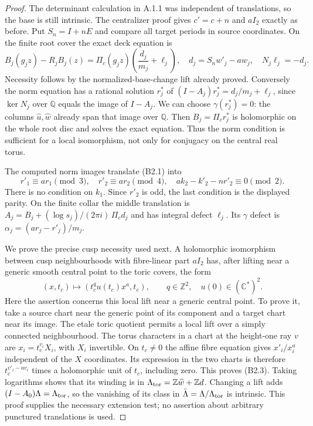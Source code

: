 \begin{proof}
The determinant calculation in A.1.1 was independent of translations, so the base is still intrinsic. The centralizer proof gives $c'=c+n$ and $aI_2$ exactly as before. Put $S_n=I+nE$ and compare all target periods in source coordinates. On the finite root cover the exact deck equation is
\[
 B_j(g_jz)-R_jB_j(z)=\Pi_c(g_jz)\left(\frac{d_j}{m_j}+\ell_j\right),
 \quad d_j=S_nw'_j-a w_j,
 \quad N_j\ell_j=-d_j.                                      \tag{B2.1}
\]
Necessity follows by the normalized-base-change lift already proved. Conversely the norm equation has a rational solution $r_j^*$ of
$(I-A_j)r_j^*=d_j/m_j+\ell_j$, since $\ker N_j$ over $\mathbb Q$ equals the image of $I-A_j$. We can choose $\gamma(r_j^*)=0$: the columns $\widehat u,\widehat w$ already span that image over $\mathbb Q$. Then $B_j=\Pi_cr_j^*$ is holomorphic on the whole root disc and solves the exact equation. Thus the norm condition is sufficient for a local isomorphism, not only for conjugacy on the central real torus.

The computed norm images translate (B2.1) into
\[
 r'_1\equiv ar_1\pmod3,\quad r'_2\equiv ar_2\pmod4,
 \quad ak_2-k'_2-nr'_2\equiv0\pmod2.                       \tag{B2.2}
\]
There is no condition on $k_1$. Since $r'_2$ is odd, the last condition is the displayed parity. On the finite collar the middle translation is
$A_j=B_j+(\log s_j)/(2\pi i)\,\Pi_cd_j$ and has integral defect $\ell_j$. Its $\gamma$ defect is
$\alpha_j=(ar_j-r'_j)/m_j$.

We prove the precise cusp necessity used next. A holomorphic isomorphism between cusp neighbourhoods with fibre-linear part $aI_2$ has, after lifting near a generic smooth central point to the toric covers, the form
\[
 (x,t_c)\longmapsto(t_c^q u(t_c)x^a,t_c),\qquad q\in\mathbb Z^2,
 \quad u(0)\in(\mathbb C^*)^2.                           \tag{B2.3}
\]
Here the assertion concerns this local lift near a generic central point. To prove it, take a source chart near the generic point of its component and a target chart near its image. The etale toric quotient permits a local lift over a simply connected neighbourhood. The torus characters in a chart at the height-one ray $v$ are $x_i=t_c^{v_i}X_i$, with $X_i$ invertible. On $t_c\ne0$ the affine fibre equation gives $x'_i/x_i^a$ independent of the $X$ coordinates. Its expression in the two charts is therefore $t_c^{v'_i-av_i}$ times a holomorphic unit of $t_c$, including zero. This proves (B2.3). Taking logarithms shows that its winding is in $\Lambda_{\rm tor}=\mathbb Z\widehat w+\mathbb Zd$. Changing a lift adds $(I-A_0)\Lambda=\Lambda_{\rm tor}$, so the vanishing of its class in $\bar\Lambda=\Lambda/\Lambda_{\rm tor}$ is intrinsic. This proof supplies the necessary extension test; no assertion about arbitrary punctured translations is used.


\end{proof}
